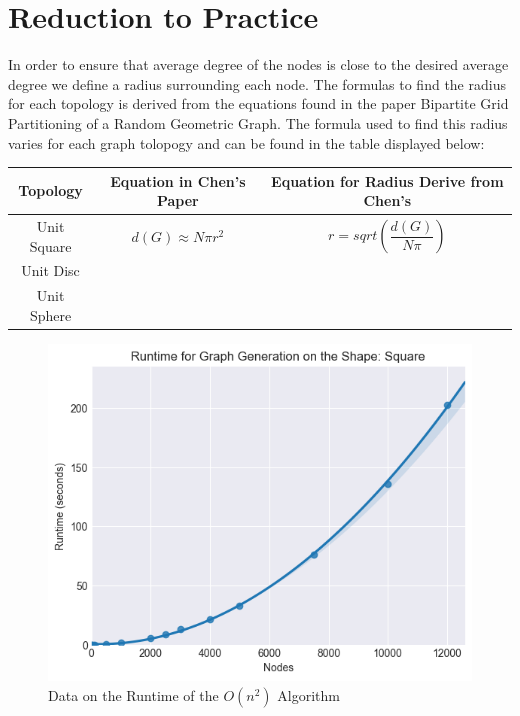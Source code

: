 \documentclass{article}
\begin{document}
  \section{Reduction to Practice}

  In order to ensure that average degree of the nodes is close to the desired average degree we define a radius surrounding each node.
  The formulas to find the radius for each topology is derived from the equations found in the paper Bipartite Grid Partitioning of a Random Geometric Graph\cite{chen2017bipartite}.
  The formula used to find this radius varies for each graph tolopogy and can be found in the table displayed below:

  \begin{tabular}{ |c|c|c| }
	  \hline
	  Topology & Equation in Chen's Paper & Equation for Radius Derive from Chen's \\
	  \hline
	  Unit Square & $d(G) \approx N\pi r^2 $ & $r = sqrt(\dfrac{d(G)}{N\pi})$ \\
	  \hline
	  Unit Disc   & & \\
	  \hline
	  Unit Sphere & & \\
	  \hline
  \end{tabular}

  \begin{figure}[!htb]
    \centering
    \includegraphics[width=1 \textwidth]{square/runtime/runtime_chart_naive}
    \caption{Data on the Runtime of the $O(n^2)$ Algorithm}
  \end{figure}
\end{document}
